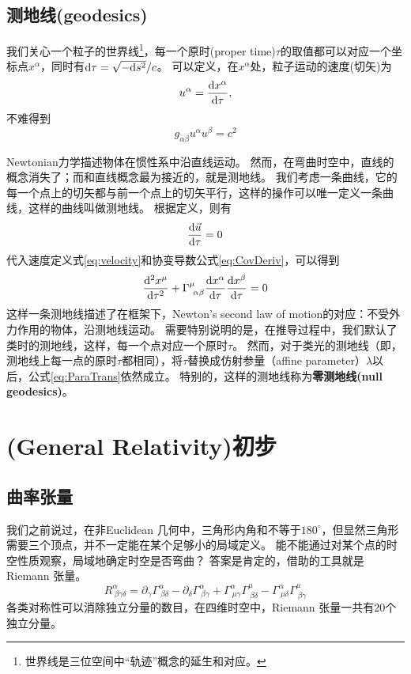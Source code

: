 \subsection{测地线(geodesics)}
我们关心一个粒子的世界线\footnote{世界线是三位空间中“轨迹”概念的延生和对应。}，每一个原时(proper time)$\tau$的取值都可以对应一个坐标点$x^\alpha$，同时有${\rm d}\tau = \sqrt{-{\rm d}s^2}/c$。
可以定义，在$x^\alpha$处，粒子运动的速度(切矢)为
\begin{equation}\label{eq:velocity}
  u^\alpha = \frac{{\rm d}x^\alpha}{{\rm d}\tau},
\end{equation}
不难得到
\begin{equation}\label{eq:gmunuNorm}
  g_{\alpha \beta}u^\alpha u^\beta = c^2  
\end{equation}

Newtonian力学描述物体在惯性系中沿直线运动。
然而，在弯曲时空中，直线的概念消失了；而和直线概念最为接近的，就是测地线。
我们考虑一条曲线，它的每一个点上的切矢都与前一个点上的切矢平行，这样的操作可以唯一定义一条曲线，这样的曲线叫做测地线。
根据定义，则有
\begin{equation}\label{eq:ParaTrans}
  \frac{{\rm d}\vec{u}}{{\rm d}\tau}=0
\end{equation}
代入速度定义式\ref{eq:velocity}和协变导数公式\ref{eq:CovDeriv}，可以得到
\begin{equation}\label{eq:ParaTrans}
  \frac{{\rm d}^2 x^\mu}{{\rm d}\tau^2}+ \Gamma^\mu_{~\alpha\beta}\frac{{\rm d}x^\alpha}{{\rm d}\tau}\frac{{\rm d}x^\beta}{{\rm d}\tau}=0
\end{equation}
这样一条测地线描述了在\GR 框架下，Newton's second law of motion的对应：不受外力作用的物体，沿测地线运动。
需要特别说明的是，在推导过程中，我们默认了类时的测地线，这样，每一个点对应一个原时$\tau$。
然而，对于类光的测地线（即，测地线上每一点的原时$\tau$都相同），将$\tau$替换成仿射参量（affine parameter）$\lambda$以后，公式\ref{eq:ParaTrans}依然成立。
特别的，这样的测地线称为{\textbf{零测地线(null geodesics)}}。

\section{\GR (General Relativity)初步}
\subsection{曲率张量}
我们之前说过，在非Euclidean 几何中，三角形内角和不等于$180^\circ$，但显然三角形需要三个顶点，并不一定能在某个足够小的局域定义。
能不能通过对某个点的时空性质观察，局域地确定时空是否弯曲？
答案是肯定的，借助的工具就是Riemann 张量。
\begin{equation}\label{eq:RiemannTensor}
  R^\alpha_{~\beta\gamma\delta}= \partial_\gamma \Gamma^{\alpha}_{~\beta \delta}- \partial_\delta\Gamma^{\alpha}_{~\beta \gamma }+\Gamma^{\alpha}_{~\mu \gamma }\Gamma^{\mu}_{~\beta \delta }-\Gamma^{\alpha}_{~\mu \delta }\Gamma^{\mu}_{~\beta \gamma } 
\end{equation}
各类对称性可以消除独立分量的数目，在四维时空中，Riemann 张量一共有20个独立分量。

